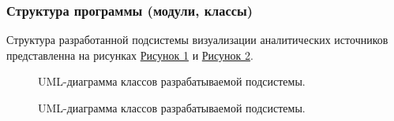 \documentclass[a4paper]{extarticle}
\begin{document}
\subsubsection{Структура программы (модули, классы)}
Структура разработанной подсистемы визуализации аналитических источников представленна на рисунках \hyperref[umlClassDiagram:ris1]{Рисунок 1} и \hyperref[umlClassDiagram:ris2]{Рисунок 2}.
\begin{figure}[H]
\caption{UML-диаграмма классов разрабатываемой подсистемы.}
\label{umlClassDiagram:ris1}
\end{figure}\par
\begin{figure}[H]
\caption{UML-диаграмма классов разрабатываемой подсистемы.}
\label{umlClassDiagram:ris2}
\end{figure}\par
\end{document}
